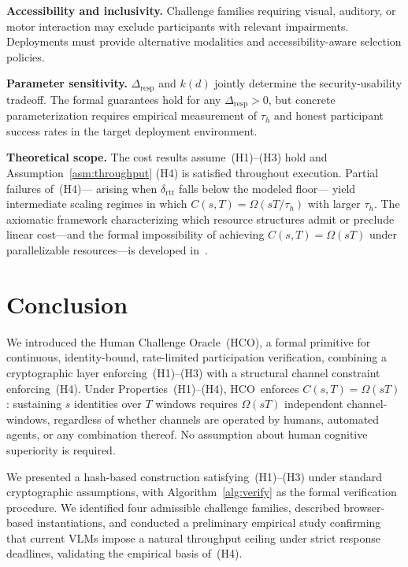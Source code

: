 \documentclass[11pt]{article}
\newcommand{\HCO}{HCO\xspace}
\theoremstyle{remark}
\theoremstyle{plain}
\begin{document}
	\noindent\textbf{Accessibility and inclusivity.}
	Challenge families requiring visual, auditory, or motor interaction may
	exclude participants with relevant impairments. Deployments must provide
	alternative modalities and accessibility-aware selection policies.
	
	\noindent\textbf{Parameter sensitivity.}
	$\Delta_{\mathrm{resp}}$ and $k(d)$ jointly determine the security-usability
	tradeoff. The formal guarantees hold for any $\Delta_{\mathrm{resp}} > 0$,
	but concrete parameterization requires empirical measurement of $\tau_h$
	and honest participant success rates in the target deployment environment.
	
	\noindent\textbf{Theoretical scope.}
	The cost results assume~(H1)--(H3) hold and Assumption~\ref{asm:throughput}
	(H4) is satisfied throughout execution. Partial failures of~(H4)---
	arising when $\delta_{\mathrm{rtt}}$ falls below the modeled floor---
	yield intermediate scaling regimes in which $C(s,T) = \Omega(sT/\tau_h)$
	with larger $\tau_h$. The axiomatic framework characterizing which
	resource structures admit or preclude linear cost---and the formal
	impossibility of achieving $C(s,T) = \Omega(sT)$ under parallelizable
	resources---is developed in~\cite{maleki2026geometry}.
	
	
	\section{Conclusion}
	\label{sec:conclusion}
	
	We introduced the Human Challenge Oracle~(\HCO), a formal primitive
	for continuous, identity-bound, rate-limited participation verification,
	combining a cryptographic layer enforcing~(H1)--(H3) with a structural
	channel constraint enforcing~(H4). Under Properties~(H1)--(H4), \HCO\ enforces
	$C(s,T) = \Omega(sT)$: sustaining $s$ identities over $T$ windows
	requires $\Omega(sT)$ independent channel-windows, regardless of
	whether channels are operated by humans, automated agents, or any
	combination thereof. No assumption about human cognitive superiority
	is required.
	
	We presented a hash-based construction satisfying~(H1)--(H3) under
	standard cryptographic assumptions, with Algorithm~\ref{alg:verify}
	as the formal verification procedure. We identified four admissible
	challenge families, described browser-based instantiations, and
	conducted a preliminary empirical study confirming that current VLMs
	impose a natural throughput ceiling under strict response deadlines,
	validating the empirical basis of~(H4).
	
\end{document}

